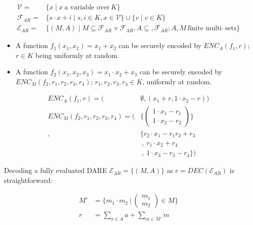 \begin{align*}
  \mathcal{V} = & \{ x \mid x~\text{a variable over}~K \} \\
%
  \mathcal{F}_{AR} = & \{ s \cdot x + i \mid s, i \in K, x \in \mathcal{V} \}
  \cup \{ v \mid v \in K \} \\
%
  \mathcal{E}_{AR} = & \{ (M, A) \mid
    M \subseteq \mathcal{F}_{AR} \times \mathcal{F}_{AR},
    A \subseteq, \mathcal{F}_{AR};
    A, M~\text{finite multi--sets} \}
%
\end{align*}


\label{sec:affinization_encoding}

\begin{itemize}

\item A function $f_1(x_1, x_2) = x_1 + x_2$ can be securely encoded by
$ENC_A(f_1, r)$; $r \in K$ being uniformly at random.

\item A function $f_2(x_1, x_2, x_3) = x_1 \cdot x_2 + x_3$ can be securely
encoded by $ENC_M(f_2, r_1, r_2, r_3, r_4)$; $r_1, r_2, r_3, r_4 \in
K$, uniformly at random.

\end{itemize}

\begin{align*}
ENC_A(f_1, r) = \Big( & \emptyset, (x_1 + r, 1 \cdot x_2 - r)\Big) \\
ENC_M(f_2,  r_1, r_2, r_3, r_4) = \Bigg( & \bigg\{
\begin{pmatrix}1 \cdot x_1 - r_1\\1 \cdot x_2 - r_2\end{pmatrix} \bigg\}\\
,& \bigg\{r_2 \cdot x_1 -r_1r_2+r_3 \\
&\ ,\ r_1 \cdot x_2 + r_4 \\
&\ ,\ 1 \cdot x_3-r_3-r_4\bigg\} \Bigg)
\end{align*}


\label{sec:affinization_decoding}

Decoding a fully evaluated DARE $\mathcal{E}_{AR} = \{(M,A)\}$ as $r =
DEC(\mathcal{E}_{AR})$ is
straightforward:

\begin{align*}
M' &= \Bigg\{ m_1 \cdot m_2\ \Bigg|\ \begin{pmatrix}m_1\\m_2\end{pmatrix}
\in M \Bigg\} \\
r & = \sum_{a \in A} a + \sum_{m \in M'} m
\end{align*}


